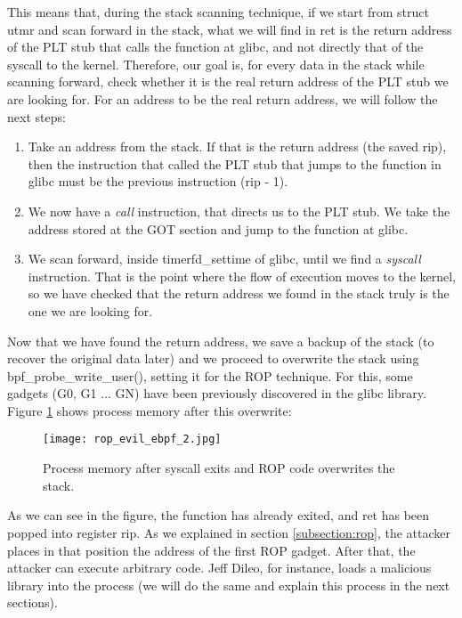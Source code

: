 This means that, during the stack scanning technique, if we start from struct utmr and scan forward in the stack, what we will find in ret is the return address of the PLT stub that calls the function at glibc, and not directly that of the syscall to the kernel. Therefore, our goal is, for every data in the stack while scanning forward, check whether it is the real return address of the PLT stub we are looking for. For an address to be the real return address, we will follow the next steps:
\begin{enumerate}
\item Take an address from the stack. If that is the return address (the saved rip), then the instruction that called the PLT stub that jumps to the function in glibc must be the previous instruction (rip - 1).
\item We now have a \textit{call} instruction, that directs us to the PLT stub. We take the address stored at the GOT section and jump to the function at glibc.
\item We scan forward, inside timerfd\_settime of glibc, until we find a \textit{syscall} instruction. That is the point where the flow of execution moves to the kernel, so we have checked that the return address we found in the stack truly is the one we are looking for.
\end{enumerate}

Now that we have found the return address, we save a backup of the stack (to recover the original data later) and we proceed to overwrite the stack using bpf\_probe\_write\_user(), setting it for the ROP technique. For this, some gadgets (G0, G1 ... GN) have been previously discovered in the glibc library. Figure \ref{fig:rop_evil_ebpf_2} shows process memory after this overwrite:

\begin{figure}[H]
	\centering
	\texttt{[image: rop\_evil\_ebpf\_2.jpg]}
	\caption{Process memory after syscall exits and ROP code overwrites the stack.}
	\label{fig:rop_evil_ebpf_2}
\end{figure}

As we can see in the figure, the function has already exited, and ret has been popped into register rip. As we explained in section \ref{subsection:rop}, the attacker places in that position the address of the first ROP gadget. After that, the attacker can execute arbitrary code. Jeff Dileo, for instance, loads a malicious library into the process (we will do the same and explain this process in the next sections).

